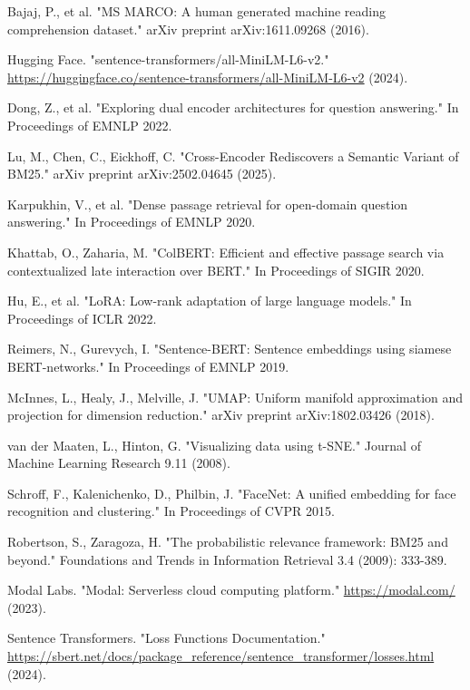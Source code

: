 \documentclass[conference]{IEEEtran}
\begin{document}
\begin{thebibliography}{00}
 Bajaj, P., et al. "MS MARCO: A human generated machine reading comprehension dataset." arXiv preprint arXiv:1611.09268 (2016).

 Hugging Face. "sentence-transformers/all-MiniLM-L6-v2." \url{https://huggingface.co/sentence-transformers/all-MiniLM-L6-v2} (2024).

 Dong, Z., et al. "Exploring dual encoder architectures for question answering." In Proceedings of EMNLP 2022.

 Lu, M., Chen, C., Eickhoff, C. "Cross-Encoder Rediscovers a Semantic Variant of BM25." arXiv preprint arXiv:2502.04645 (2025).

 Karpukhin, V., et al. "Dense passage retrieval for open-domain question answering." In Proceedings of EMNLP 2020.

 Khattab, O., Zaharia, M. "ColBERT: Efficient and effective passage search via contextualized late interaction over BERT." In Proceedings of SIGIR 2020.

 Hu, E., et al. "LoRA: Low-rank adaptation of large language models." In Proceedings of ICLR 2022.

 Reimers, N., Gurevych, I. "Sentence-BERT: Sentence embeddings using siamese BERT-networks." In Proceedings of EMNLP 2019.

 McInnes, L., Healy, J., Melville, J. "UMAP: Uniform manifold approximation and projection for dimension reduction." arXiv preprint arXiv:1802.03426 (2018).

 van der Maaten, L., Hinton, G. "Visualizing data using t-SNE." Journal of Machine Learning Research 9.11 (2008).


 Schroff, F., Kalenichenko, D., Philbin, J. "FaceNet: A unified embedding for face recognition and clustering." In Proceedings of CVPR 2015.

 Robertson, S., Zaragoza, H. "The probabilistic relevance framework: BM25 and beyond." Foundations and Trends in Information Retrieval 3.4 (2009): 333-389.

 Modal Labs. "Modal: Serverless cloud computing platform." \url{https://modal.com/} (2023).

 Sentence Transformers. "Loss Functions Documentation." \url{https://sbert.net/docs/package_reference/sentence_transformer/losses.html} (2024).
\end{thebibliography}
\end{document}
